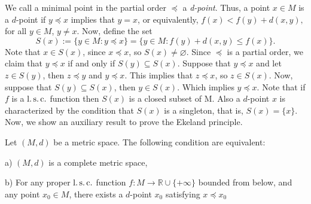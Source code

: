     We call a minimal point in the partial order $\preceq$ a \textit{d-point}.
    Thus, a point $x \in M$ is a $d$-point if $y \preceq x$ implies that $y = x$,
    or equivalently,
    $
        f(x) < f(y) + d(x,y),
    $
    for all $y \in M$, $y \neq x$. Now, define the set 
    $$
        S(x) := \{ y \in M : y \preceq x\} =%
                \{ y \in M : f(y) + d(x,y) \leq f(x) \}.
    $$
    Note that $x \in S(x)$, since $x \preceq x$, so $S(x) \neq \varnothing$.
    Since $\preceq$ is a partial order, we claim that $y \preceq x$ if and only
    if $S(y) \subseteq S(x)$. Suppose that $y \preceq x $ and let $z \in S(y)$, 
    then $z \preceq y$ and $y \preceq x$. This implies that $z \preceq x$, 
    so $z \in S(x)$. Now, suppose that $S(y) \subseteq S(x)$, then $y \in S(x)$.
    Which implies $y \preceq x$. Note that if $f$ is a $\operatorname{l.s.c.}$
    function then $S(x)$ is a closed subset of M. Also a $d$-point $x$ is 
    characterized by the condition that $S(x)$ is  a singleton, that is,
    $S(x) = \{ x \}$. Now, we show an auxiliary result to prove the Ekeland
    principle.
    \begin{theorem}\label{Thm_3.1}
        Let $(M, d)$ be a metric space. The following condition are equivalent:
        \begin{asparaenum}
            \item[a)]
                $(M, d)$ is a complete metric space,
            \item[b)]
                For any proper $\operatorname{l.s.c.}$ function  $f: M \to \mathbb{R}\cup%
                \{+ \infty\} $  bounded from below, and any point $x_0 \in M$,
                there exists a $d$-point $x_0$ satisfying $x \preceq x_0$
        \end{asparaenum}
    \end{theorem}
    
